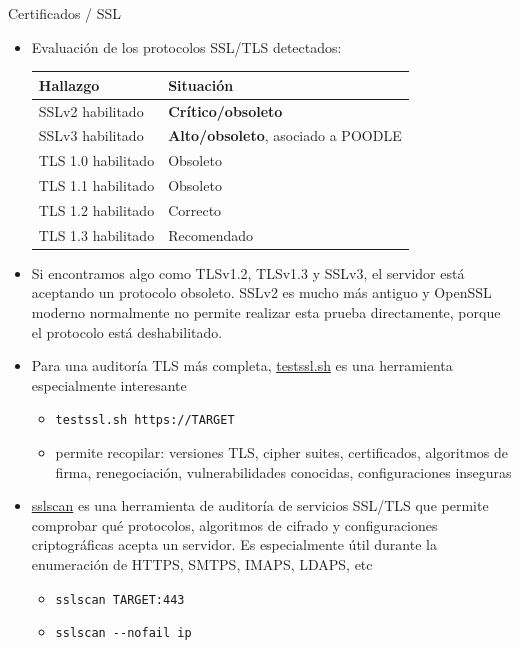 \documentclass[aspectratio=169,11pt]{beamer}
\newcommand{\cmd}[1]{\texttt{#1}}
\begin{document}
\begin{frame}[allowframebreaks]{Certificados / SSL}
\begin{itemize}
  \item Evaluación de los protocolos SSL/TLS detectados:
        \begin{center}
        \footnotesize
        \begin{tabular}{ll}
          \toprule
          \textbf{Hallazgo} & \textbf{Situación} \\
          \midrule
          SSLv2 habilitado   & \textbf{Crítico/obsoleto} \\
          SSLv3 habilitado   & \textbf{Alto/obsoleto}, asociado a POODLE \\
          TLS 1.0 habilitado & Obsoleto \\
          TLS 1.1 habilitado & Obsoleto \\
          TLS 1.2 habilitado & Correcto \\
          TLS 1.3 habilitado & Recomendado \\
          \bottomrule
        \end{tabular}
        \end{center}
  \item Si encontramos algo como TLSv1.2, TLSv1.3 y SSLv3, el servidor está aceptando un protocolo obsoleto. SSLv2 es mucho más antiguo y OpenSSL moderno normalmente no permite realizar esta prueba directamente, porque el protocolo está deshabilitado.
  \item Para una auditoría TLS más completa, \href{https://github.com/testssl/testssl.sh}{testssl.sh} es una herramienta especialmente interesante
      \begin{itemize}
        \item \cmd{testssl.sh https://TARGET}
        \item permite recopilar: versiones TLS, cipher suites, certificados, algoritmos de firma, renegociación, vulnerabilidades conocidas, configuraciones inseguras
        \end{itemize}
      \item \href{https://github.com/rbsec/sslscan}{sslscan} es una herramienta de auditoría de servicios SSL/TLS que permite comprobar qué protocolos, algoritmos de cifrado y configuraciones criptográficas acepta un servidor. Es especialmente útil durante la enumeración de HTTPS, SMTPS, IMAPS, LDAPS, etc
      \begin{itemize}
      \item \cmd{sslscan TARGET:443}
      \item \cmd{sslscan -{}-nofail ip}
       \end{itemize}


\end{itemize}
\end{frame}
\end{document}
